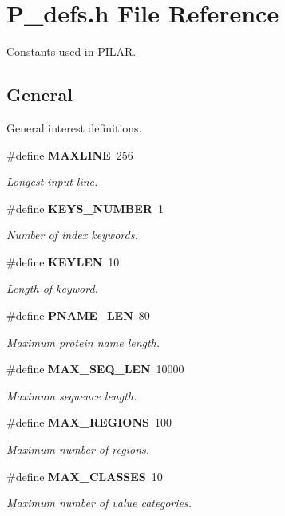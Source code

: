 \section{P\_\-defs.h File Reference}
\label{P__defs_8h}
Constants used in PILAR. 


\subsection*{General}
General interest definitions.\begin{CompactItemize}
\item 
\#define {\bf MAXLINE}\ 256
\begin{CompactList}\small\item\em Longest input line.\item\end{CompactList}\item 
\#define {\bf KEYS\_\-NUMBER}\ 1
\begin{CompactList}\small\item\em Number of index keywords.\item\end{CompactList}\item 
\#define {\bf KEYLEN}\ 10
\begin{CompactList}\small\item\em Length of keyword.\item\end{CompactList}\item 
\#define {\bf PNAME\_\-LEN}\ 80
\begin{CompactList}\small\item\em Maximum protein name length.\item\end{CompactList}\item 
\#define {\bf MAX\_\-SEQ\_\-LEN}\ 10000
\begin{CompactList}\small\item\em Maximum sequence length.\item\end{CompactList}\item 
\#define {\bf MAX\_\-REGIONS}\ 100
\begin{CompactList}\small\item\em Maximum number of regions.\item\end{CompactList}\item 
\#define {\bf MAX\_\-CLASSES}\ 10
\begin{CompactList}\small\item\em Maximum number of value categories.\item\end{CompactList}\item 

\end{CompactItemize}
